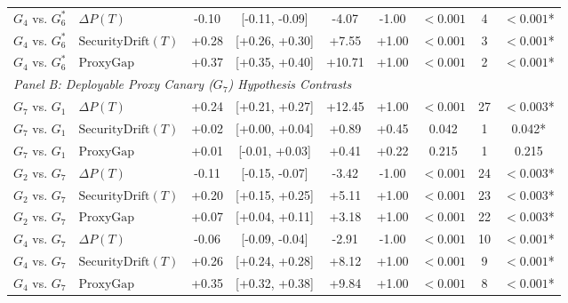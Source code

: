 \begin{table}[t]
\begin{tabular}{llccccccc}
$G_4$ vs. $G_6^*$ & $\Delta P(T)$ & -0.10 & [-0.11, -0.09] & -4.07 & -1.00 & $<0.001$ & 4 & \textbf{$<0.001$}* \\
$G_4$ vs. $G_6^*$ & $\text{SecurityDrift}(T)$ & +0.28 & [+0.26, +0.30] & +7.55 & +1.00 & $<0.001$ & 3 & \textbf{$<0.001$}* \\
$G_4$ vs. $G_6^*$ & $\text{ProxyGap}$ & +0.37 & [+0.35, +0.40] & +10.71 & +1.00 & $<0.001$ & 2 & \textbf{$<0.001$}* \\
\midrule
\multicolumn{9}{l}{\textit{Panel B: Deployable Proxy Canary ($G_7$) Hypothesis Contrasts}} \\
\midrule
$G_7$ vs. $G_1$ & $\Delta P(T)$ & +0.24 & [+0.21, +0.27] & +12.45 & +1.00 & $<0.001$ & 27 & \textbf{$<0.003$}* \\
$G_7$ vs. $G_1$ & $\text{SecurityDrift}(T)$ & +0.02 & [+0.00, +0.04] & +0.89 & +0.45 & 0.042 & 1 & 0.042* \\
$G_7$ vs. $G_1$ & $\text{ProxyGap}$ & +0.01 & [-0.01, +0.03] & +0.41 & +0.22 & 0.215 & 1 & 0.215 \\
$G_2$ vs. $G_7$ & $\Delta P(T)$ & -0.11 & [-0.15, -0.07] & -3.42 & -1.00 & $<0.001$ & 24 & \textbf{$<0.003$}* \\
$G_2$ vs. $G_7$ & $\text{SecurityDrift}(T)$ & +0.20 & [+0.15, +0.25] & +5.11 & +1.00 & $<0.001$ & 23 & \textbf{$<0.003$}* \\
$G_2$ vs. $G_7$ & $\text{ProxyGap}$ & +0.07 & [+0.04, +0.11] & +3.18 & +1.00 & $<0.001$ & 22 & \textbf{$<0.003$}* \\
$G_4$ vs. $G_7$ & $\Delta P(T)$ & -0.06 & [-0.09, -0.04] & -2.91 & -1.00 & $<0.001$ & 10 & \textbf{$<0.001$}* \\
$G_4$ vs. $G_7$ & $\text{SecurityDrift}(T)$ & +0.26 & [+0.24, +0.28] & +8.12 & +1.00 & $<0.001$ & 9 & \textbf{$<0.001$}* \\
$G_4$ vs. $G_7$ & $\text{ProxyGap}$ & +0.35 & [+0.32, +0.38] & +9.84 & +1.00 & $<0.001$ & 8 & \textbf{$<0.001$}* \\
\bottomrule
\end{tabular}
\end{table}
